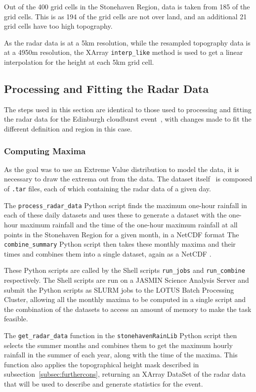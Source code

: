 \documentclass[12pt,a4paper]{report}
\begin{document}
Out of the 400 grid cells in the Stonehaven Region,
    data is taken from 185 of the grid cells.
This is as 194 of the grid cells are not over land,
    and an additional 21 grid cells have too high topography.

As the radar data is at a 5km resolution,
    while the resampled topography data is at a 4950m resolution,
    the XArray \texttt{interp\_like} method is used to get a linear interpolation for the height at each 5km grid cell.

\subsection{Processing and Fitting the Radar Data}\label{subsec:radarprocess}

The steps used in this section are identical to those used to processing and fitting the radar data for the Edinburgh cloudburst event~\cite{Tett_Soon},
    with changes made to fit the different definition and region in this case.

\subsubsection{Computing Maxima}

As the goal was to use an Extreme Value distribution to model the data,
    it is necessary to draw the extrema out from the data.
The dataset itself~\cite{radar_data} is composed of \texttt{.tar} files, each of which containing the radar data of a given day.

The \texttt{process\_radar\_data} Python script finds the maximum one-hour rainfall in each of these daily datasets and
    uses these to generate a dataset with the one-hour maximum rainfall and the time of the one-hour maximum rainfall
    at all points in the Stonehaven Region for a given month, in a NetCDF format
The \texttt{combine\_summary} Python script then takes these monthly maxima and their times and combines them into a single dataset,
    again as a NetCDF .

These Python scripts are called by the Shell scripts \texttt{run\_jobs} and \texttt{run\_combine} respectively.
The Shell scripts are run on a JASMIN Science Analysis Server and submit the Python scripts as SLURM jobs to the LOTUS Batch Processing Cluster,
    allowing all the monthly maxima to be computed in a single script and the combination of the datasets to access an amount of memory to make the task feasible.

The \texttt{get\_radar\_data} function in the \texttt{stonehavenRainLib} Python script then selects the summer months and
    combines them to get the maximum hourly rainfall in the summer of each year,
    along with the time of the maxima.
This function also applies the topographical height mask described in subsection~\ref{subsec:furthercons},
    returning an XArray DataSet of the radar data that will be used to describe and generate statistics for the event.
\end{document}
